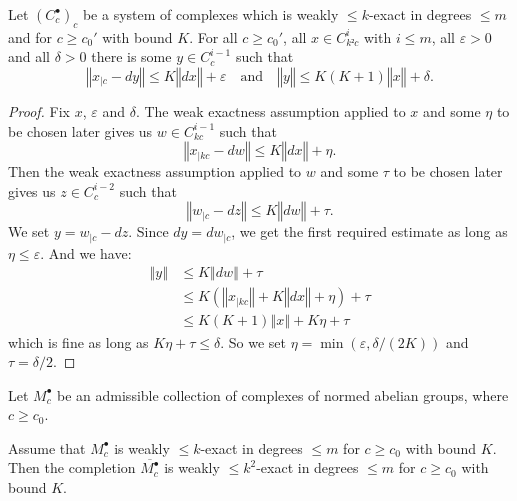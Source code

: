 \begin{lemma}
  \label{is_weak_bdd_exact_controlled_y}
  Let $(C_c^\bullet)_c$ be a system of complexes which is
  weakly $\leq k$-exact in degrees $\leq m$ and for $c\geq c_0'$ with bound $K$.
  For all $c\geq c_0'$, all $x\in C_{k²c}^i$ with $i\leq m$, all $ε > 0$ and all $δ > 0$
  there is some $y\in C_c^{i-1}$ such that
  \[
    ‖x_{|c} - dy‖ ≤  K ‖dx‖ + ε
    \quad \text{and} \quad
    ‖y‖ ≤ K(K + 1)‖x‖ + δ.
  \]
\end{lemma}

\begin{proof}
  Fix $x$, $ε$ and $δ$. The weak exactness assumption applied to $x$ and some $η$ to be chosen later gives us
  $w ∈ C_{kc}^{i-1}$ such that
  \[
    ‖x_{|kc} - dw‖ ≤  K ‖dx‖ + η.
  \]
  Then the weak exactness assumption applied to $w$ and some $τ$ to be chosen later gives us
  $z ∈ C_{c}^{i-2}$ such that
  \[
    ‖w_{|c} - dz‖ ≤  K ‖dw‖ + τ.
  \]
  We set $y = w_{|c} - dz$. Since $dy = dw_{|c}$, we get the first required estimate as long
  as $η ≤ ε$. And we have:
  \begin{align*}
    ‖y‖ &≤ K ‖dw‖ + τ \\
        &≤ K (‖x_{|kc}‖ + K‖dx‖ + η) + τ \\
        &≤ K(K + 1) ‖x‖ + Kη + τ
  \end{align*}
  which is fine as long as $Kη + τ ≤ δ$.
  So we set $η = \min(ε, δ/(2K))$ and $τ = δ/2$.
\end{proof}

\begin{lemma}
  \label{completion_is_weakexact}
  Let $M^\bullet_c$ be an admissible collection
  of complexes of normed abelian groups, where $c\geq c_0$.

  Assume that $M^\bullet_c$ is weakly $\leq k$-exact in degrees $\leq m$ for $c\geq c_0$ with bound $K$.
  Then the completion $\overline{M^\bullet_c}$ is weakly $\leq k^2$-exact in degrees $\leq m$ for $c\geq c_0$ with bound $K$.
\end{lemma}

